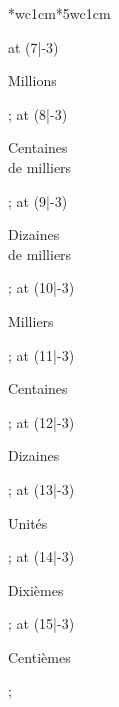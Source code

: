{{{\begin{center}
\begin{NiceTabular}{*{}{wc{1cm}}*{5}{wc{1cm}}}
{          \tikz\node[rotate=58] at (7|-3) {\begin{minipage}{1.5cm}\begin{center}\scriptsize Millions\end{center}\end{minipage}};
          \tikz\node[rotate=58] at (8|-3) {\begin{minipage}{1.5cm}\begin{center}\scriptsize Centaines\\de milliers\end{center}\end{minipage}};
          \tikz\node[rotate=58] at (9|-3) {\begin{minipage}{1.5cm}\begin{center}\scriptsize Dizaines\\de milliers\end{center}\end{minipage}};
          \tikz\node[rotate=58] at (10|-3) {\begin{minipage}{1.5cm}\begin{center}\scriptsize Milliers\end{center}\end{minipage}};
          \tikz\node[rotate=58] at (11|-3) {\begin{minipage}{1.5cm}\begin{center}\scriptsize Centaines\end{center}\end{minipage}};
          \tikz\node[rotate=58] at (12|-3) {\begin{minipage}{1.5cm}\begin{center}\scriptsize Dizaines\end{center}\end{minipage}};
          \tikz\node[rotate=58] at (13|-3) {\begin{minipage}{1.5cm}\begin{center}\scriptsize Unités\end{center}\end{minipage}};
          \tikz\node[rotate=58] at (14|-3) {\begin{minipage}{1.5cm}\begin{center}\scriptsize Dixièmes\end{center}\end{minipage}};
          \tikz\node[rotate=58] at (15|-3) {\begin{minipage}{1.5cm}\begin{center}\scriptsize Centièmes\end{center}\end{minipage}};
}
\end{NiceTabular}
\end{center}}}}
